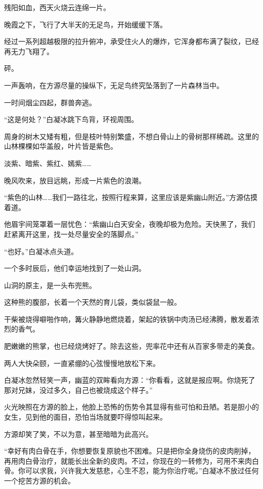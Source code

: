 
\begin{this_body}



残阳如血，西天火烧云连绵一片。

晚霞之下，飞行了大半天的无足鸟，开始缓缓下落。

经过一系列超越极限的拉升俯冲，承受住火人的爆炸，它浑身都布满了裂纹，已经再无力飞翔了。

砰。

一声轰响，在方源尽量的操纵下，无足鸟终究坠落到了一片森林当中。

一时间烟尘四起，群兽奔逃。

“这是何处？”白凝冰跳下鸟背，环视周围。

周身的树木又矮有粗，但是枝叶特别繁盛，不想白骨山上的骨树那样稀疏。这里的山林棵棵如华盖般，叶片皆是紫色。

淡紫、暗紫、紫红、嫣紫……

晚风吹来，放目远眺，形成一片紫色的浪潮。

“紫色的山林……我们一路往北，按照行程来算，这里应该是紫幽山附近。”方源估摸着道。

他眉宇间笼罩着一层忧色：“紫幽山白天安全，夜晚却极为危险。天快黑了，我们赶紧离开这里，找一处尽量安全的落脚点。”

“也好。”白凝冰点头道。

一个多时辰后，他们幸运地找到了一处山洞。

山洞的原主，是一头布兜熊。

这种熊的腹部，长着一个天然的育儿袋，类似袋鼠一般。

干柴被烧得噼啪作响，篝火静静地燃烧着，架起的铁锅中肉汤已经沸腾，散发着浓烈的香气。

肥嫩嫩的熊掌，也已经烧烤好了。除去这些，兜率花中还有从百家多带走的美食。

两人大快朵颐，一直紧绷的心弦慢慢地放松下来。

白凝冰忽然轻笑一声，幽蓝的双眸看向方源：“你看看，这就是报应啊。你烧死了那对兄妹，没过多久，自己也被烧成这个样子。”

火光映照在方源的脸上，他脸上恐怖的伤势令其显得有些可怕和丑陋。若是胆小的女生，见到他的面目，恐怕当场就要吓得惊叫起来。

方源却笑了笑，不以为意，甚至暗暗为此高兴。

“幸好有肉白骨在手，你想要恢复原貌也不困难。只是把你全身烧伤的皮肉削掉，再用肉白骨治疗，就能长出全新的皮肉。不过，你现在的一转修为，可用不来肉白骨。你可以求我，兴许我大发慈悲，心生不忍，能为你治疗呢。”白凝冰不放过任何一个挖苦方源的机会。


\end{this_body}
